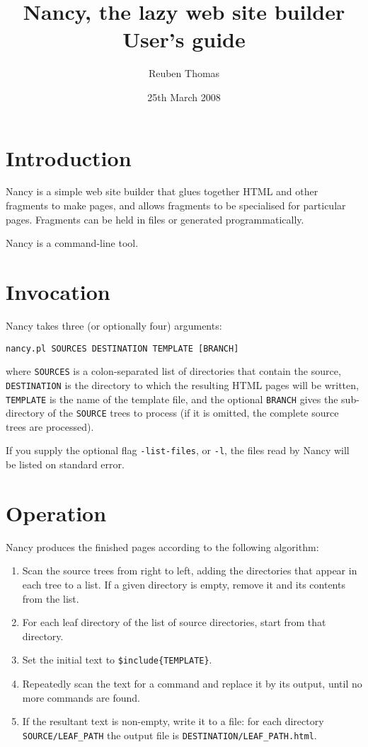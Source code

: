 \documentclass[english]{scrartcl}
\begin{document}
\title{Nancy, the lazy web site builder\\User's guide}
\date{25th March 2008}
\author{Reuben Thomas}
\maketitle

\section{Introduction}

Nancy is a simple web site builder that glues together HTML and other fragments to make pages, and allows fragments to be specialised for particular pages. Fragments can be held in files or generated programmatically.

Nancy is a command-line tool.

\section{Invocation}

Nancy takes three (or optionally four) arguments:

\begin{verbatim}
nancy.pl SOURCES DESTINATION TEMPLATE [BRANCH]
\end{verbatim}

\noindent where \verb|SOURCES| is a colon-separated list of directories that contain the source, \verb|DESTINATION| is the directory to which the resulting HTML pages will be written, \verb|TEMPLATE| is the name of the template file, and the optional \verb|BRANCH| gives the sub-directory of the \verb|SOURCE| trees to process (if it is omitted, the complete source trees are processed).

If you supply the optional flag \verb|-list-files|, or \verb|-l|, the files read by Nancy will be listed on standard error.

\section{Operation}
\label{operation}

Nancy produces the finished pages according to the following algorithm:

\begin{enumerate}
\item Scan the source trees from right to left, adding the directories that appear in each tree to a list. If a given directory is empty, remove it and its contents from the list.
\item For each leaf directory of the list of source directories, start from that directory.
\item Set the initial text to \verb|$include{TEMPLATE}|.
\item Repeatedly scan the text for a command and replace it by its output, until no more commands are found.
\item If the resultant text is non-empty, write it to a file: for each   directory \verb|SOURCE/LEAF_PATH| the output file is   \verb|DESTINATION/LEAF_PATH.html|.
\end{enumerate}
\end{document}
